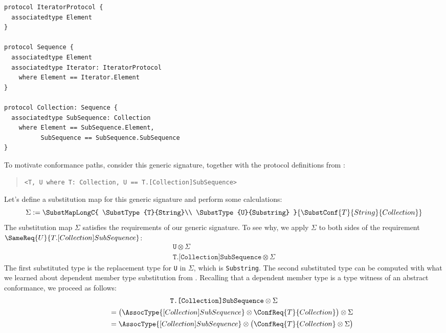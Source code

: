 \documentclass[../generics]{subfiles}
\begin{document}
\begin{listing}\label{conformance paths listing}
\begin{Verbatim}
protocol IteratorProtocol {
  associatedtype Element
}

protocol Sequence {
  associatedtype Element
  associatedtype Iterator: IteratorProtocol
    where Element == Iterator.Element
}

protocol Collection: Sequence {
  associatedtype SubSequence: Collection
    where Element == SubSequence.Element,
          SubSequence == SubSequence.SubSequence
}
\end{Verbatim}
\end{listing}
To motivate conformance paths, consider this generic signature, together with the protocol definitions from :
\begin{quote}
\begin{verbatim}
<T, U where T: Collection, U == T.[Collection]SubSequence>
\end{verbatim}
\end{quote}
Let's define a substitution map for this generic signature and perform some calculations:
\[
\Sigma := \SubstMapLongC{
\SubstType{T}{String}\\
\SubstType{U}{Substring}
}{
\SubstConf{T}{String}{Collection}
}
\]
The substitution map $\Sigma$ satisfies the requirements of our generic signature. To see why, we apply $\Sigma$ to both sides of the requirement $\SameReq{U}{T.[Collection]SubSequence}$:
\begin{gather*}
\texttt{U} \otimes \Sigma\\
\texttt{T.[Collection]SubSequence} \otimes \Sigma
\end{gather*}
The first substituted type is the replacement type for \texttt{U} in $\Sigma$, which is \texttt{Substring}. The second substituted type can be computed with what we learned about dependent member type substitution from . Recalling that a dependent member type is a type witness of an abstract conformance, we proceed as follows:
\begin{gather*}
\texttt{T.[Collection]SubSequence} \otimes \Sigma\\
\qquad {} = \bigl(\AssocType{[Collection]SubSequence} \otimes \ConfReq{T}{Collection}\bigr) \otimes \Sigma\\
\qquad {} = \AssocType{[Collection]SubSequence} \otimes \bigl(\ConfReq{T}{Collection} \otimes \Sigma\bigr)
\end{gather*}
\end{document}
